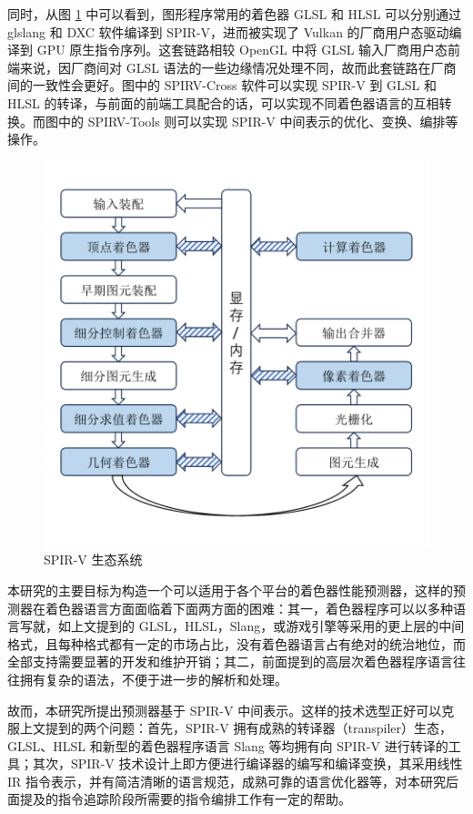 同时，从图 \ref{fig:spirv_ecosystem} 中可以看到，图形程序常用的着色器 GLSL 和 HLSL 可以分别通过 glslang 和 DXC 软件编译到 SPIR-V，进而被实现了 Vulkan 的厂商用户态驱动编译到 GPU 原生指令序列。这套链路相较 OpenGL 中将 GLSL 输入厂商用户态前端来说，因厂商间对 GLSL 语法的一些边缘情况处理不同，故而此套链路在厂商间的一致性会更好。图中的 SPIRV-Cross 软件可以实现 SPIR-V 到 GLSL 和 HLSL 的转译，与前面的前端工具配合的话，可以实现不同着色器语言的互相转换。而图中的 SPIRV-Tools 则可以实现 SPIR-V 中间表示的优化、变换、编排等操作。

\begin{figure}
    \centering
    \includegraphics[page=3, width=0.8\linewidth, trim=50 50 50 50, clip]{figures/pictures.pdf}
    \caption{SPIR-V 生态系统}
    \label{fig:spirv_ecosystem}
\end{figure}

本研究的主要目标为构造一个可以适用于各个平台的着色器性能预测器，这样的预测器在着色器语言方面面临着下面两方面的困难：其一，着色器程序可以以多种语言写就，如上文提到的 GLSL，HLSL，Slang，或游戏引擎等采用的更上层的中间格式，且每种格式都有一定的市场占比，没有着色器语言占有绝对的统治地位，而全部支持需要显著的开发和维护开销；其二，前面提到的高层次着色器程序语言往往拥有复杂的语法，不便于进一步的解析和处理。

故而，本研究所提出预测器基于 SPIR-V 中间表示。这样的技术选型正好可以克服上文提到的两个问题：首先，SPIR-V 拥有成熟的转译器（transpiler）生态，GLSL、HLSL 和新型的着色器程序语言 Slang 等均拥有向 SPIR-V 进行转译的工具；其次，SPIR-V 技术设计上即方便进行编译器的编写和编译变换，其采用线性 IR 指令表示，并有简洁清晰的语言规范，成熟可靠的语言优化器等，对本研究后面提及的指令追踪阶段所需要的指令编排工作有一定的帮助。

